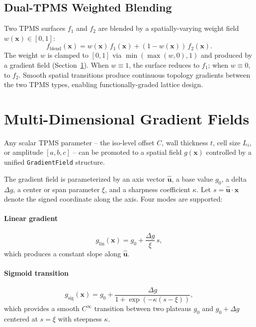 \documentclass[11pt]{article}
\begin{document}
\subsection{Dual-TPMS Weighted Blending}

Two TPMS surfaces $f_1$ and $f_2$ are blended by a spatially-varying
weight field $w(\mathbf{x}) \in [0, 1]$:
\begin{equation}\label{eq:blend}
  f_{\text{blend}}(\mathbf{x})
    = w(\mathbf{x})\, f_1(\mathbf{x})
    + (1 - w(\mathbf{x}))\, f_2(\mathbf{x}).
\end{equation}
The weight $w$ is clamped to $[0, 1]$ via
$\min(\max(w, 0), 1)$ and produced by a gradient field
(Section~\ref{sec:gradient-fields}).  When $w \equiv 1$, the surface
reduces to $f_1$; when $w \equiv 0$, to $f_2$.  Smooth spatial
transitions produce continuous topology gradients between the two
TPMS types, enabling functionally-graded lattice design.

\section{Multi-Dimensional Gradient Fields}\label{sec:gradient-fields}

Any scalar TPMS parameter -- the iso-level offset $C$, wall thickness
$t$, cell size $L_i$, or amplitude $[a, b, c]$ -- can be promoted to
a spatial field $g(\mathbf{x})$ controlled by a unified
\texttt{GradientField} structure.

The gradient field is parameterized by an axis vector
$\hat{\mathbf{u}}$, a base value $g_0$, a delta $\Delta g$, a center
or span parameter $\xi$, and a sharpness coefficient $\kappa$.  Let
$s = \hat{\mathbf{u}} \cdot \mathbf{x}$ denote the signed coordinate
along the axis.  Four modes are supported:

\paragraph{Linear gradient}
\begin{equation}\label{eq:grad-linear}
  g_{\text{lin}}(\mathbf{x}) = g_0 + \frac{\Delta g}{\xi}\, s,
\end{equation}
which produces a constant slope along $\hat{\mathbf{u}}$.

\paragraph{Sigmoid transition}
\begin{equation}\label{eq:grad-sigmoid}
  g_{\text{sig}}(\mathbf{x}) = g_0 + \frac{\Delta g}{1 + \exp(-\kappa(s - \xi))},
\end{equation}
which provides a smooth $C^\infty$ transition between two plateaus
$g_0$ and $g_0 + \Delta g$ centered at $s = \xi$ with steepness
$\kappa$.
\end{document}
